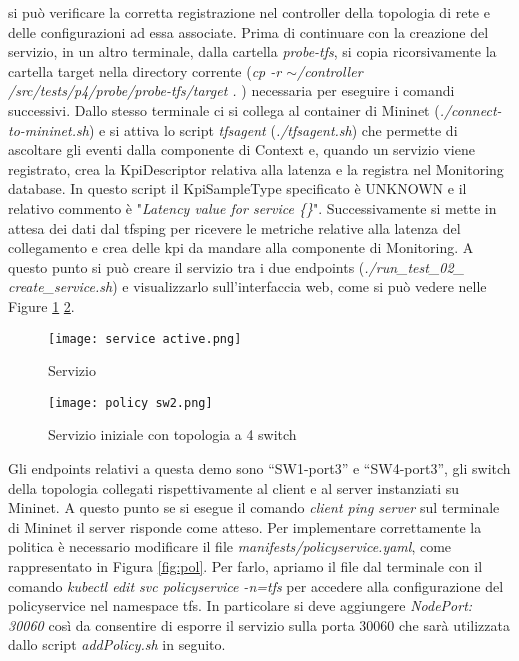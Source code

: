si può verificare la corretta registrazione nel controller della topologia di rete e delle configurazioni ad essa associate.
\newline Prima di continuare con la creazione del servizio, in un altro terminale, dalla cartella
\textit{probe-tfs}, si copia ricorsivamente la cartella target nella directory corrente (\textit{cp -r $\sim$/controller /src/tests/p4/probe/probe-tfs/target . })
necessaria per eseguire i comandi successivi.
Dallo stesso terminale ci si collega al container di Mininet (\textit{./connect-to-mininet.sh}) e
si attiva lo script \textit{tfsagent} (\textit{./tfsagent.sh}) che permette di ascoltare gli eventi dalla componente di Context e, 
quando un servizio viene registrato, crea la KpiDescriptor relativa alla latenza e la registra nel Monitoring database.
In questo script il KpiSampleType specificato è UNKNOWN e il relativo commento è "\textit{Latency value for service \{\}}".
Successivamente si mette in attesa dei dati dal tfsping per ricevere le metriche relative alla latenza del collegamento e crea delle kpi da mandare alla componente di Monitoring.
\newline A questo punto si può creare il servizio tra i due endpoints (\textit{./run\_test\_02\_ create\_service.sh}) e visualizzarlo sull'interfaccia web, come si può vedere nelle Figure \ref{fig:ser} \ref{fig:sw4}.
\begin{figure}[h]
    \centering
    \texttt{[image: service active.png]}
    \caption{Servizio}
    \label{fig:ser}
\end{figure}
\begin{figure}[h]
    \centering
    \texttt{[image: policy sw2.png]}
    \caption{Servizio iniziale con topologia a 4 switch}
    \label{fig:sw4}
\end{figure}
Gli endpoints relativi a questa demo sono “SW1-port3” e “SW4-port3”, 
gli switch della topologia collegati rispettivamente al client e al server instanziati su Mininet.
A questo punto se si esegue il comando \textit{client ping server} sul terminale di Mininet il server risponde come atteso.
Per implementare correttamente la politica è necessario modificare il file \textit{manifests/policyservice.yaml}, come rappresentato in Figura \ref{fig:pol}.
Per farlo, apriamo il file dal terminale con il comando \textit{kubectl edit svc policyservice -n=tfs} per accedere alla configurazione del policyservice nel namespace tfs.
In particolare si deve aggiungere \textit{NodePort: 30060} così da consentire di esporre il servizio sulla porta 30060 che sarà utilizzata dallo script \textit{addPolicy.sh} in seguito.
